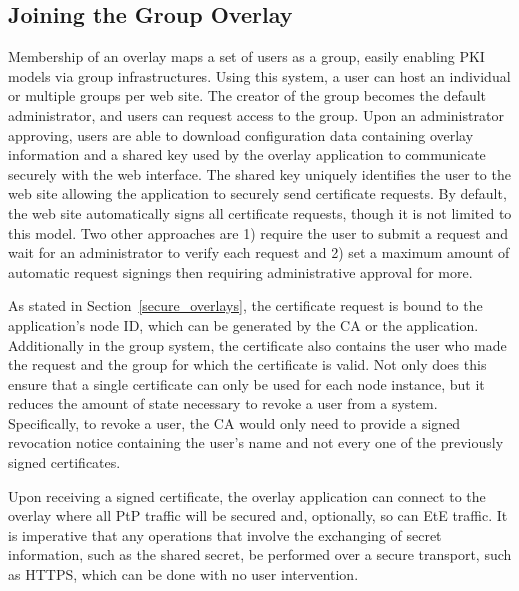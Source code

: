 \subsection{Joining the Group Overlay}
Membership of an overlay maps a set of users as a group, easily enabling PKI
models via group infrastructures.  Using this system, a user can host an
individual or multiple groups per web site.  The creator of the group becomes
the default administrator, and users can request access to the group.  Upon an
administrator approving, users are able to download configuration data
containing overlay information and a shared key used by the overlay application
to communicate securely with the web interface.  The shared key uniquely
identifies the user to the web site allowing the application to securely send
certificate requests.  By default, the web site automatically signs all
certificate requests, though it is not limited to this model.  Two other
approaches are 1) require the user to submit a request and wait for an
administrator to verify each request and 2) set a maximum amount of automatic
request signings then requiring administrative approval for more.

As stated in Section~\ref{secure_overlays}, the certificate request is bound
to the application's node ID, which can be generated by the CA or the
application.  Additionally in the group system, the certificate also contains
the user who made the request and the group for which the certificate is valid.
Not only does this ensure that a single certificate can only be used for each
node instance, but it reduces the amount of state necessary to revoke a user
from a system.  Specifically, to revoke a user, the CA would only need to
provide a signed revocation notice containing the user's name and not every one
of the previously signed certificates.

Upon receiving a signed certificate, the overlay application can connect to the
overlay where all PtP traffic will be secured and, optionally, so can EtE
traffic.  It is imperative that any operations that involve the exchanging of
secret information, such as the shared secret, be performed over a secure
transport, such as HTTPS, which can be done with no user intervention.

